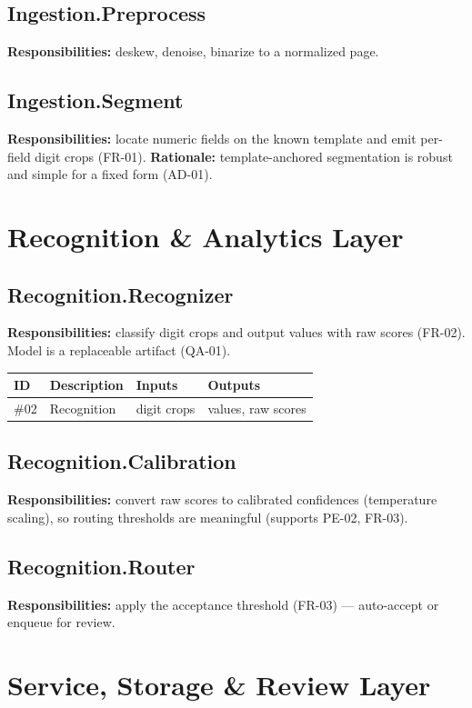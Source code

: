 \documentclass[11pt,letterpaper]{article}
\begin{document}
\subsection{Ingestion.Preprocess}
\textbf{Responsibilities:} deskew, denoise, binarize to a normalized page.
\subsection{Ingestion.Segment}
\textbf{Responsibilities:} locate numeric fields on the known template and emit
per-field digit crops (FR-01). \textbf{Rationale:} template-anchored segmentation is
robust and simple for a fixed form (AD-01).

\section{Recognition \& Analytics Layer}
\subsection{Recognition.Recognizer}
\textbf{Responsibilities:} classify digit crops and output values with raw scores
(FR-02). Model is a replaceable artifact (QA-01).
\begin{table}[H]\begin{center}\begin{tabular}{ | p{1cm} | p{6cm} | p{2.6cm} | p{2.6cm} |}\hline
ID & Description & Inputs & Outputs \\ \hline
\#02 & Recognition & digit crops & values, raw scores \\ \hline
\end{tabular}\end{center}\end{table}
\subsection{Recognition.Calibration}
\textbf{Responsibilities:} convert raw scores to calibrated confidences (temperature
scaling), so routing thresholds are meaningful (supports PE-02, FR-03).
\subsection{Recognition.Router}
\textbf{Responsibilities:} apply the acceptance threshold (FR-03) --- auto-accept or
enqueue for review.

\section{Service, Storage \& Review Layer}
\end{document}
